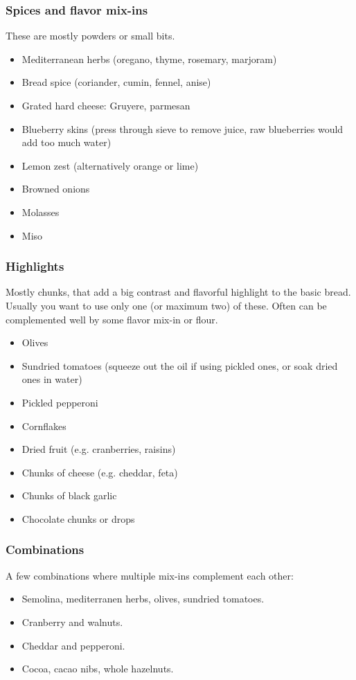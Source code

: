 \subsubsection{Spices and flavor mix-ins}
These are mostly powders or small bits.
\begin{itemize}
  \item Mediterranean herbs (oregano, thyme, rosemary, marjoram)
  \item Bread spice (coriander, cumin, fennel, anise)
  \item Grated hard cheese: Gruyere, parmesan
  \item Blueberry skins (press through sieve to remove juice, raw blueberries would add too much water)
  \item Lemon zest (alternatively orange or lime)
  \item Browned onions
  \item Molasses
  \item Miso
\end{itemize}

\subsubsection{Highlights}
Mostly chunks, that add a big contrast and flavorful highlight to the basic bread. Usually you want to use only one (or maximum two) of these. Often can be complemented well by some flavor mix-in or flour.
\begin{itemize}
  \item Olives
  \item Sundried tomatoes (squeeze out the oil if using pickled ones, or soak dried ones in water)
  \item Pickled pepperoni
  \item Cornflakes
  \item Dried fruit (e.g. cranberries, raisins)
  \item Chunks of cheese (e.g. cheddar, feta)
  \item Chunks of black garlic
  \item Chocolate chunks or drops
\end{itemize}

\subsubsection{Combinations}
A few combinations where multiple mix-ins complement each other:
\begin{itemize}
  \item Semolina, mediterranen herbs, olives, sundried tomatoes.
  \item Cranberry and walnuts.
  \item Cheddar and pepperoni.
  \item Cocoa, cacao nibs, whole hazelnuts.
\end{itemize}

